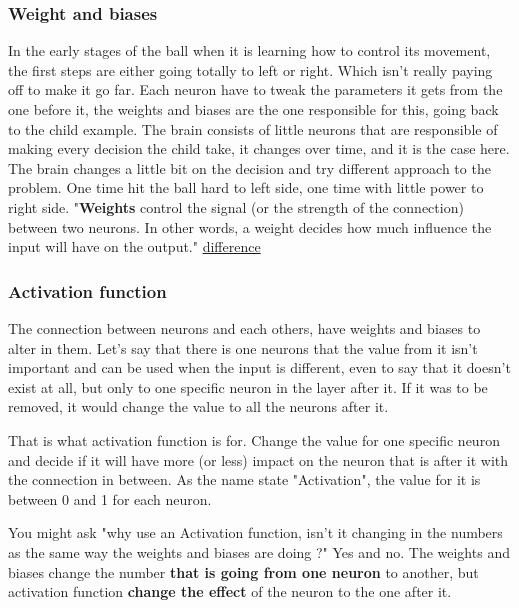 \subsubsection{Weight and biases}

In the early stages of the ball when it is learning how to control its movement, the first steps are either going totally to left or right. Which isn't really paying off to make it go far. Each neuron have to tweak the parameters it gets from the one before it, the weights and biases are the one responsible for this, going back to the child example. The brain consists of little neurons that are responsible of making every decision the child take, it changes over time, and it is the case here. The brain changes a little bit on the decision and try different approach to the problem. One time hit the ball hard to left side, one time with little power to right side. "\textbf{Weights} control the signal (or the strength of the connection) between two neurons. In other words, a weight decides how much influence the input will have on the output." \href{https://machine-learning.paperspace.com/wiki/weights-and-biases}{difference}

\subsubsection{Activation function} \label{sec:activation-function}
The connection between neurons and each others, have weights and biases to alter in them. Let's say that there is one neurons that the value from it isn't important and can be used when the input is different, even to say that it doesn't exist at all, but only to one specific neuron in the layer after it. If it was to be removed, it would change the value to all the neurons after it.

That is what activation function is for. Change the value for one specific neuron and decide if it will have more (or less) impact on the neuron that is after it with the connection in between. As the name state "Activation", the value for it is between 0 and 1 for each neuron.

You might ask "why use an Activation function, isn't it changing in the numbers as the same way the weights and biases are doing ?" Yes and no. The weights and biases change the number \textbf{that is going from one neuron} to another, but activation function \textbf{change the effect} of the neuron to the one after it.

